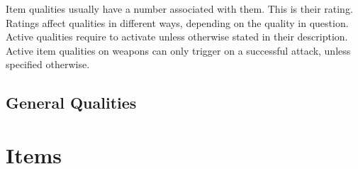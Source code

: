 \begin{multicols}{2}
Item qualities usually have a number associated with them. This is their rating.
Ratings affect qualities in different ways, depending on the quality in question.
Active qualities require \advantage\advantage to activate unless otherwise stated
in their description. Active item qualities on weapons can only trigger on a
successful attack, unless specified otherwise.

\subsection {General Qualities}






































\end{multicols}
\section{Items}\label{sec:items}

